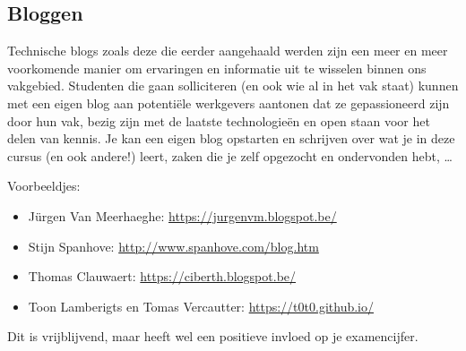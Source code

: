 \subsection{Bloggen}%
\label{subs:bloggen}

Technische blogs zoals deze die eerder aangehaald werden zijn een meer en meer voorkomende manier om ervaringen en informatie uit te wisselen binnen ons vakgebied. Studenten die gaan solliciteren (en ook wie al in het vak staat) kunnen met een eigen blog aan potentiële werkgevers aantonen dat ze gepassioneerd zijn door hun vak, bezig zijn met de laatste technologieën en open staan voor het delen van kennis. Je kan een eigen blog opstarten en schrijven over wat je in deze cursus (en ook andere!) leert, zaken die je zelf opgezocht en ondervonden hebt, \ldots

Voorbeeldjes:

\begin{itemize}
\item Jürgen Van Meerhaeghe: \url{https://jurgenvm.blogspot.be/}
\item Stijn Spanhove: \url{http://www.spanhove.com/blog.htm}
\item Thomas Clauwaert: \url{https://ciberth.blogspot.be/}
\item Toon Lamberigts en Tomas Vercautter: \url{https://t0t0.github.io/}
\end{itemize}

Dit is vrijblijvend, maar heeft wel een positieve invloed op je examencijfer.

